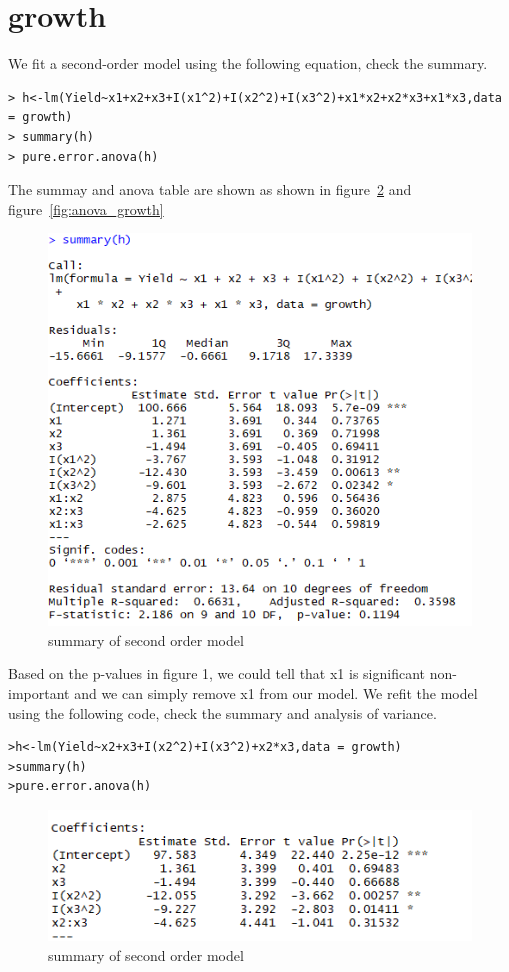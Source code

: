 \documentclass[11pt]{article}
\begin{document}
\section{growth}
\label{sec:1}

We fit a second-order model using the following equation, check the summary.
\begin{verbatim}
> h<-lm(Yield~x1+x2+x3+I(x1^2)+I(x2^2)+I(x3^2)+x1*x2+x2*x3+x1*x3,data = growth)
> summary(h)
> pure.error.anova(h)
\end{verbatim}
The summay and anova table are shown as shown in figure~\ref{fig:summary_growth} and figure~\ref{fig:anova_growth}
\begin{figure}[h!]

  \center
  \includegraphics[scale = .45]{pictures/summary_growth.png}
  \caption{summary of second order model}
  \label{fig:summary_growth}
\end{figure}

Based on the p-values in figure 1, we could tell that x1 is significant non-important and we can simply remove x1 from our model. We refit the model using the following code, check the summary and analysis of variance.
\begin{verbatim}
>h<-lm(Yield~x2+x3+I(x2^2)+I(x3^2)+x2*x3,data = growth)
>summary(h)
>pure.error.anova(h)
\end{verbatim}

\begin{figure}[h!]

  \center
  \includegraphics[scale = .45]{pictures/summary_growth2.png}
  \caption{summary of second order model}
  \label{fig:summary_growth}
\end{figure}
\end{document}
